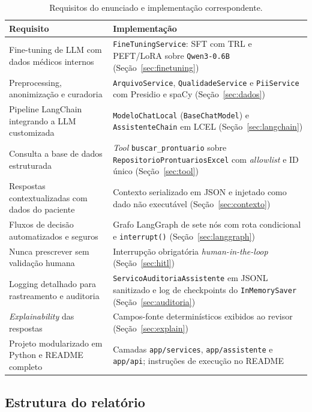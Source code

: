 \documentclass[12pt,a4paper]{article}
\begin{document}
\begin{table}[htbp]
\centering
\caption{Requisitos do enunciado e implementação correspondente.}
\label{tab:requisitos}
\footnotesize
\begin{tabularx}{\textwidth}{L{5.3cm} X}
\toprule
\textbf{Requisito} & \textbf{Implementação} \\
\midrule
Fine-tuning de LLM com dados médicos internos &
\texttt{FineTuningService}: SFT com TRL e PEFT/LoRA sobre \texttt{Qwen3-0.6B}
(Seção~\ref{sec:finetuning}) \\
\addlinespace
Preprocessing, anonimização e curadoria &
\texttt{ArquivoService}, \texttt{QualidadeService} e \texttt{PiiService} com
Presidio e spaCy (Seção~\ref{sec:dados}) \\
\addlinespace
Pipeline LangChain integrando a LLM customizada &
\texttt{ModeloChatLocal} (\texttt{BaseChatModel}) e \texttt{AssistenteChain} em
LCEL (Seção~\ref{sec:langchain}) \\
\addlinespace
Consulta a base de dados estruturada &
\emph{Tool} \texttt{buscar\_prontuario} sobre \texttt{RepositorioProntuariosExcel}
com \emph{allowlist} e ID único (Seção~\ref{sec:tool}) \\
\addlinespace
Respostas contextualizadas com dados do paciente &
Contexto serializado em JSON e injetado como dado não executável
(Seção~\ref{sec:contexto}) \\
\addlinespace
Fluxos de decisão automatizados e seguros &
Grafo LangGraph de sete nós com rota condicional e \texttt{interrupt()}
(Seção~\ref{sec:langgraph}) \\
\addlinespace
Nunca prescrever sem validação humana &
Interrupção obrigatória \emph{human-in-the-loop} (Seção~\ref{sec:hitl}) \\
\addlinespace
Logging detalhado para rastreamento e auditoria &
\texttt{ServicoAuditoriaAssistente} em JSONL sanitizado e log de checkpoints do
\texttt{InMemorySaver} (Seção~\ref{sec:auditoria}) \\
\addlinespace
\emph{Explainability} das respostas &
Campos-fonte determinísticos exibidos ao revisor (Seção~\ref{sec:explain}) \\
\addlinespace
Projeto modularizado em Python e README completo &
Camadas \texttt{app/services}, \texttt{app/assistente} e \texttt{app/api};
instruções de execução no README \\
\bottomrule
\end{tabularx}
\end{table}

\subsection{Estrutura do relatório}
\end{document}
